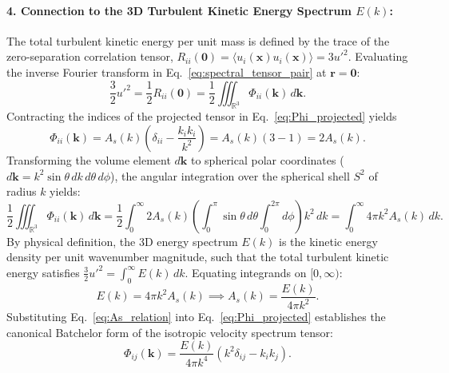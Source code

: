 \documentclass[lineno]{jfm}
\begin{document}
\paragraph{4. Connection to the 3D Turbulent Kinetic Energy Spectrum $E(k)$:}
The total turbulent kinetic energy per unit mass is defined by the trace of the zero-separation correlation tensor, $R_{ii}(\mathbf{0}) = \langle u_i(\mathbf{x}) u_i(\mathbf{x}) \rangle = 3 u'^2$. Evaluating the inverse Fourier transform in Eq.~\eqref{eq:spectral_tensor_pair} at $\mathbf{r} = \mathbf{0}$:
\begin{equation}
\frac{3}{2} u'^2 = \frac{1}{2} R_{ii}(\mathbf{0}) = \frac{1}{2} \iiint_{\mathbb{R}^3} \Phi_{ii}(\mathbf{k})\,d\mathbf{k}.
\label{eq:TKE_trace_integral}
\end{equation}
Contracting the indices of the projected tensor in Eq.~\eqref{eq:Phi_projected} yields
\begin{equation}
\Phi_{ii}(\mathbf{k}) = A_s(k) \left( \delta_{ii} - \frac{k_i k_i}{k^2} \right) = A_s(k) (3 - 1) = 2 A_s(k).
\end{equation}
Transforming the volume element $d\mathbf{k}$ to spherical polar coordinates ($d\mathbf{k} = k^2 \sin\theta\,dk\,d\theta\,d\phi$), the angular integration over the spherical shell $S^2$ of radius $k$ yields:
\begin{equation}
\frac{1}{2} \iiint_{\mathbb{R}^3} \Phi_{ii}(\mathbf{k})\,d\mathbf{k} = \frac{1}{2} \int_0^\infty 2 A_s(k) \left( \int_0^\pi \sin\theta\,d\theta \int_0^{2\pi} d\phi \right) k^2\,dk = \int_0^\infty 4\pi k^2 A_s(k)\,dk.
\label{eq:spherical_shell_int}
\end{equation}
By physical definition, the 3D energy spectrum $E(k)$ is the kinetic energy density per unit wavenumber magnitude, such that the total turbulent kinetic energy satisfies $\frac{3}{2} u'^2 = \int_0^\infty E(k)\,dk$. Equating integrands on $[0, \infty)$:
\begin{equation}
E(k) = 4\pi k^2 A_s(k) \implies A_s(k) = \frac{E(k)}{4\pi k^2}.
\label{eq:As_relation}
\end{equation}
Substituting Eq.~\eqref{eq:As_relation} into Eq.~\eqref{eq:Phi_projected} establishes the canonical Batchelor form of the isotropic velocity spectrum tensor:
\begin{equation}
\Phi_{ij}(\mathbf{k}) = \frac{E(k)}{4\pi k^4} \left( k^2 \delta_{ij} - k_i k_j \right).
\label{eq:Phi_ij_isotropic}
\end{equation}
\end{document}
